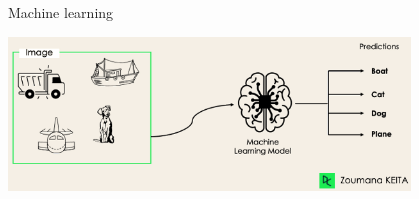 \documentclass[11pt]{beamer}
\begin{document}
\begin{frame}{Machine learning \cite{pml1Book,pml2Book,classification_datacamp}}
\begin{center}
\includegraphics[width=0.8\textwidth]{Pic/4_label_classification_task_Datacamp.png}
\end{center}


\end{frame}
\end{document}
